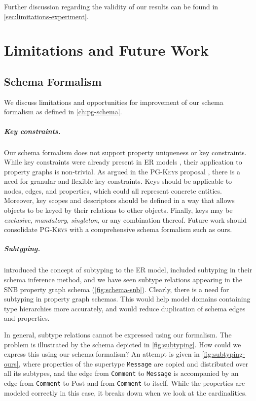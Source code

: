 \documentclass{report}
\theoremstyle{definition}
\begin{document}
Further discussion regarding the validity of our results can be found in \autoref{sec:limitations-experiment}.

\chapter{Limitations and Future Work}
\label{ch:limitations}

\section{Schema Formalism}

We discuss limitations and opportunities for improvement of our schema formalism as defined in \autoref{ch:pg-schema}.

\paragraph{Key constraints.} Our schema formalism does not support property uniqueness or key constraints. While key constraints were already present in ER models \citep{chen1976entity}, their application to property graphs is non-trivial. As argued in the \textsc{PG-Keys} proposal \citep{angles2021keys}, there is a need for granular and flexible key constraints. Keys should be applicable to nodes, edges, and properties, which could all represent concrete entities. Moreover, key scopes and descriptors should be defined in a way that allows objects to be keyed by their relations to other objects. Finally, keys may be \emph{exclusive}, \emph{mandatory}, \emph{singleton}, or any combination thereof. Future work should consolidate \textsc{PG-Keys} with a comprehensive schema formalism such as ours.

\paragraph{Subtyping.} \citet{barker1990entity} introduced the concept of subtyping to the ER model, \citet{lbath2021inference} included subtyping in their schema inference method, and we have seen subtype relations appearing in the SNB property graph schema (\autoref{fig:schema-snb}). Clearly, there is a need for subtyping in property graph schemas. This would help model domains containing type hierarchies more accurately, and would reduce duplication of schema edges and properties.

In general, subtype relations cannot be expressed using our formalism. The problem is illustrated by the schema depicted in \autoref{fig:subtyping}. How could we express this using our schema formalism? An attempt is given in \autoref{fig:subtyping-ours}, where properties of the supertype \texttt{Message} are copied and distributed over all its subtypes, and the edge from \texttt{Comment} to \texttt{Message} is accompanied by an edge from \texttt{Comment} to Post and from \texttt{Comment} to itself. While the properties are modeled correctly in this case, it breaks down when we look at the cardinalities.
\end{document}
